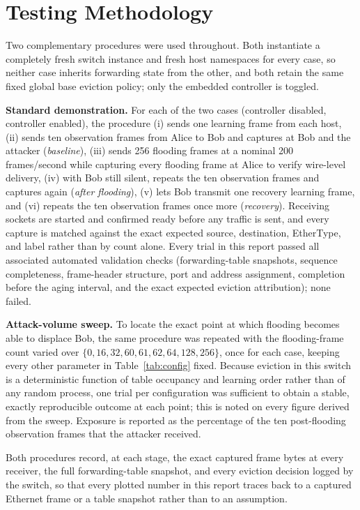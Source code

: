 \documentclass[10pt,a4paper]{article}
\begin{document}
\section{Testing Methodology}\label{sec:testing}
Two complementary procedures were used throughout. Both instantiate a completely fresh switch instance and fresh host namespaces for every case, so neither case inherits forwarding state from the other, and both retain the same fixed global base eviction policy; only the embedded controller is toggled.

\textbf{Standard demonstration.} For each of the two cases (controller disabled, controller enabled), the procedure (i) sends one learning frame from each host, (ii) sends ten observation frames from Alice to Bob and captures at Bob and the attacker (\emph{baseline}), (iii) sends 256 flooding frames at a nominal 200 frames/second while capturing every flooding frame at Alice to verify wire-level delivery, (iv) with Bob still silent, repeats the ten observation frames and captures again (\emph{after flooding}), (v) lets Bob transmit one recovery learning frame, and (vi) repeats the ten observation frames once more (\emph{recovery}). Receiving sockets are started and confirmed ready before any traffic is sent, and every capture is matched against the exact expected source, destination, EtherType, and label rather than by count alone. Every trial in this report passed all associated automated validation checks (forwarding-table snapshots, sequence completeness, frame-header structure, port and address assignment, completion before the aging interval, and the exact expected eviction attribution); none failed.

\textbf{Attack-volume sweep.} To locate the exact point at which flooding becomes able to displace Bob, the same procedure was repeated with the flooding-frame count varied over $\{0,16,32,60,61,62,64,128,256\}$, once for each case, keeping every other parameter in Table~\ref{tab:config} fixed. Because eviction in this switch is a deterministic function of table occupancy and learning order rather than of any random process, one trial per configuration was sufficient to obtain a stable, exactly reproducible outcome at each point; this is noted on every figure derived from the sweep. Exposure is reported as the percentage of the ten post-flooding observation frames that the attacker received.

Both procedures record, at each stage, the exact captured frame bytes at every receiver, the full forwarding-table snapshot, and every eviction decision logged by the switch, so that every plotted number in this report traces back to a captured Ethernet frame or a table snapshot rather than to an assumption.
\end{document}
